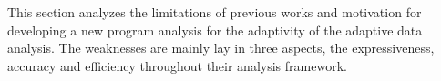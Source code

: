 This section analyzes the limitations of previous works and motivation for developing a new
program analysis for the adaptivity of the adaptive data analysis.
The weaknesses are mainly lay in three aspects, the expressiveness, accuracy and efficiency
throughout their analysis framework.
